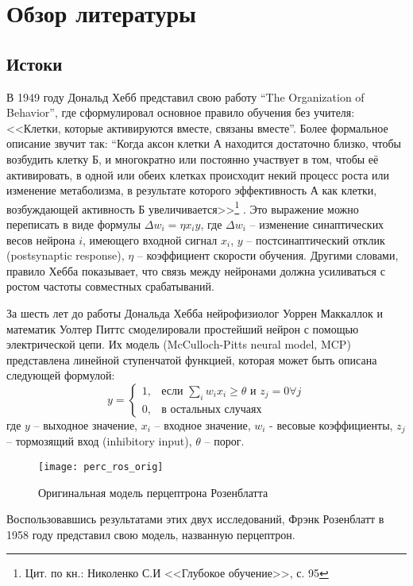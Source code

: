 \clearpage
\section{Обзор литературы}
\subsection{Истоки}
В 1949 году Дональд Хебб представил свою работу “The Organization of
Behavior”\cite{Attneave1950}, где сформулировал основное правило обучения без
учителя: <<Клетки, которые активируются вместе, связаны вместе”. Более
формальное описание звучит так: “Когда аксон клетки А находится достаточно
близко, чтобы возбудить клетку Б, и многократно или постоянно участвует в том,
чтобы её активировать, в одной или обеих клетках происходит некий процесс роста
или изменение метаболизма, в результате которого эффективность А как клетки,
возбуждающей активность Б увеличивается>>\footnote{Цит. по кн.: Николенко С.И
<<Глубокое обучение>>, с. 95} . Это выражение можно переписать в виде формулы
$\Delta w_i = \eta x_{i} y$, где $\Delta w_i$ – изменение синаптических весов
нейрона $i$, имеющего входной сигнал $x_i$, $y$ – постсинаптический отклик
(postsynaptic response),  $\eta$ -- коэффициент скорости обучения. Другими
словами, правило Хебба показывает, что связь между нейронами должна усиливаться
с ростом частоты совместных срабатываний.
\par
За шесть лет до работы Дональда Хебба нейрофизиолог Уоррен Маккаллок и математик
Уолтер Питтс смоделировали простейший нейрон с помощью электрической цепи\cite{McCulloch1943}.
Их модель (McCulloch-Pitts neural model, MCP) представлена линейной ступенчатой
функцией, которая может быть описана следующей формулой:
\begin{equation}
	y =
	\begin{cases}
		1,& \text{если } \sum_{i}{w_i x_i} \geq \theta \text{ и } z_j = 0 \forall{j} \\
		0,& \text{в остальных случаях}
	\end{cases}
\end{equation}
где $y$ – выходное значение, $x_i$ – входное значение, $w_i$ - весовые коэффициенты, $z_j$ – тормозящий вход (inhibitory input), $\theta$ -- порог.
\par
\begin{figure}[h]
	\centering
	\texttt{[image: perc\_ros\_orig]}
	\caption{Оригинальная модель перцептрона Розенблатта}
	\label{hist:rosorig}
\end{figure}
Воспользовавшись результатами этих двух исследований, Фрэнк Розенблатт в 1958 году представил свою модель, названную перцептрон\cite{Rosenblatt1958}.
